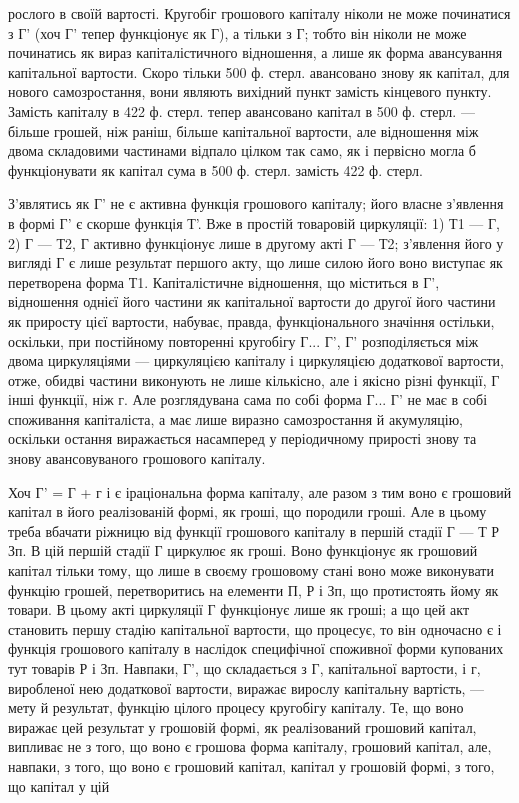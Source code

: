 рослого в своїй вартості. Кругобіг грошового капіталу ніколи не може
починатися з Г' (хоч Г' тепер функціонує як Г), а тільки з Г; тобто
він ніколи не може починатись як вираз капіталістичного відношення, а
лише як форма авансування капітальної вартости. Скоро тільки 500 ф.
стерл. авансовано знову як капітал, для нового самозростання, вони
являють вихідний пункт замість кінцевого пункту. Замість капіталу в
422 ф. стерл. тепер авансовано капітал в 500 ф. стерл. — більше
грошей, ніж раніш, більше капітальної вартости, але відношення між
двома складовими частинами відпало цілком так само, як і первісно
могла б функціонувати як капітал сума в 500 ф. стерл. замість
422 ф. стерл.

З’являтись як Г' не є активна функція грошового капіталу; його
власне з’явлення в формі Г' є скорше функція Т'. Вже в простій товаровій
циркуляції: 1) Т1 — Г, 2) Г — Т2, Г активно функціонує лише в
другому акті Г — Т2; з’явлення його у вигляді Г є лише результат першого
акту, що лише силою його воно виступає як перетворена форма
Т1. Капіталістичне відношення, що міститься в Г', відношення однієї його
частини як капітальної вартости до другої його частини як приросту
цієї вартости, набуває, правда, функціонального значіння остільки, оскільки,
при постійному повторенні кругобігу Г... Г', Г' розподіляється між двома
циркуляціями — циркуляцією капіталу і циркуляцією додаткової вартости,
отже, обидві частини виконують не лише кількісно, але і якісно
різні функції, Г інші функції, ніж г. Але розглядувана сама по собі форма
Г... Г' не має в собі споживання капіталіста, а має лише виразно
самозростання й акумуляцію, оскільки остання виражається насамперед
у періодичному прирості знову та знову авансовуваного грошового
капіталу.

Хоч Г' = Г + г і є іраціональна форма капіталу, але разом з тим воно
є грошовий капітал в його реалізованій формі, як гроші, що породили
гроші. Але в цьому треба вбачати ріжницю від функції грошового
капіталу в першій стадії Г — Т Р Зп. В цій першій стадії Г циркулює
як гроші. Воно функціонує як грошовий капітал тільки тому, що
лише в своєму грошовому стані воно може виконувати функцію грошей,
перетворитись на елементи П, Р і Зп, що протистоять йому як товари.
В цьому акті циркуляції Г функціонує лише як гроші; а що цей акт
становить першу стадію капітальної вартости, що процесує, то він одночасно
є і функція грошового капіталу в наслідок специфічної споживної
форми купованих тут товарів Р і Зп. Навпаки, Г', що складається з Г, капітальної
вартости, і г, виробленої нею додаткової вартости, виражає вирослу
капітальну вартість, — мету й результат, функцію цілого процесу
кругобігу капіталу. Те, що воно виражає цей результат у грошовій формі,
як реалізований грошовий капітал, випливає не з того, що воно є грошова
форма капіталу, грошовий капітал, але, навпаки, з того, що воно є
грошовий капітал, капітал у грошовій формі, з того, що капітал у цій
